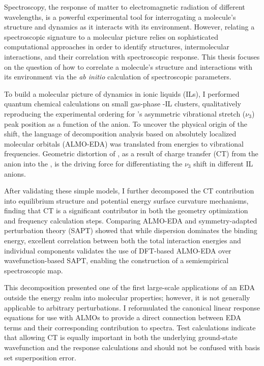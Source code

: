 \documentclass[%
  class = article,%
  crop = false,%
  float = true,%
  multi = true,%
  preview = false,%
]{standalone}
\begin{document}
\onlyifstandalone{\maketitle}
Spectroscopy, the response of matter to electromagnetic radiation of different wavelengths, is a powerful experimental tool for interrogating a molecule's structure and dynamics as it interacts with its environment. However, relating a spectroscopic signature to a molecular picture relies on sophisticated computational approaches in order to identify structures, intermolecular interactions, and their correlation with spectroscopic response. This thesis focuses on the question of how to correlate a molecule's structure and interactions with its environment via the \textit{ab initio} calculation of spectroscopic parameters.

To build a molecular picture of  dynamics in ionic liquids (ILs), I performed quantum chemical calculations on small gas-phase -IL clusters, qualitatively reproducing the experimental ordering for 's asymmetric vibrational stretch (\(\nu_3\)) peak position as a function of the anion. To uncover the physical origin of the shift, the language of decomposition analysis based on absolutely localized molecular orbitals (ALMO-EDA) was translated from energies to vibrational frequencies. Geometric distortion of , as a result of charge transfer (CT) from the anion into the , is the driving force for differentiating the  \(\nu_3\) shift in different IL anions.

After validating these simple models, I further decomposed the CT contribution into equilibrium structure and potential energy surface curvature mechanisms, finding that CT is a significant contributor in both the geometry optimization and frequency calculation steps. Comparing ALMO-EDA and symmetry-adapted perturbation theory (SAPT) showed that while dispersion dominates the binding energy, excellent correlation between both the total interaction energies and individual components validates the use of DFT-based ALMO-EDA over wavefunction-based SAPT, enabling the construction of a semiempirical spectroscopic map.

This decomposition presented one of the first large-scale applications of an EDA outside the energy realm into molecular properties; however, it is not generally applicable to arbitrary perturbations. I reformulated the canonical linear response equations for use with ALMOs to provide a direct connection between EDA terms and their corresponding contribution to spectra. Test calculations indicate that allowing CT is equally important in both the underlying ground-state wavefunction and the response calculations and should not be confused with basis set superposition error.
\end{document}
